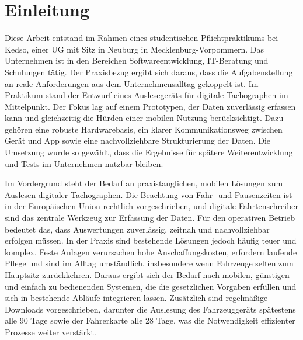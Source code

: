 \chapter{Einleitung}
\label{einleitung}
Diese Arbeit entstand im Rahmen eines studentischen Pflichtpraktikums bei Kedso, einer UG mit Sitz in Neuburg in Mecklenburg-Vorpommern. Das Unternehmen ist in den Bereichen Softwareentwicklung, IT-Beratung und Schulungen tätig. Der Praxisbezug ergibt sich daraus, dass die Aufgabenstellung an reale Anforderungen aus dem Unternehmensalltag gekoppelt ist. Im Praktikum stand der Entwurf eines Auslesegeräts für digitale Tachographen im Mittelpunkt. Der Fokus lag auf einem Prototypen, der Daten zuverlässig erfassen kann und gleichzeitig die Hürden einer mobilen Nutzung berücksichtigt. Dazu gehören eine robuste Hardwarebasis, ein klarer Kommunikationsweg zwischen Gerät und App sowie eine nachvollziehbare Strukturierung der Daten. Die Umsetzung wurde so gewählt, dass die Ergebnisse für spätere Weiterentwicklung und Tests im Unternehmen nutzbar bleiben.

Im Vordergrund steht der Bedarf an praxistauglichen, mobilen Lösungen zum Auslesen digitaler Tachographen. Die Beachtung von Fahr- und Pausenzeiten ist in der Europäischen Union rechtlich vorgeschrieben, und digitale Fahrtenschreiber sind das zentrale Werkzeug zur Erfassung der Daten. Für den operativen Betrieb bedeutet das, dass Auswertungen zuverlässig, zeitnah und nachvollziehbar erfolgen müssen. In der Praxis sind bestehende Lösungen jedoch häufig teuer und komplex. Feste Anlagen verursachen hohe Anschaffungskosten, erfordern laufende Pflege und sind im Alltag umständlich, insbesondere wenn Fahrzeuge selten zum Hauptsitz zurückkehren. Daraus ergibt sich der Bedarf nach mobilen, günstigen und einfach zu bedienenden Systemen, die die gesetzlichen Vorgaben erfüllen und sich in bestehende Abläufe integrieren lassen.
Zusätzlich sind regelmäßige Downloads vorgeschrieben, darunter die Auslesung des Fahrzeuggeräts spätestens alle 90 Tage sowie der Fahrerkarte alle 28 Tage, was die Notwendigkeit effizienter Prozesse weiter verstärkt.
